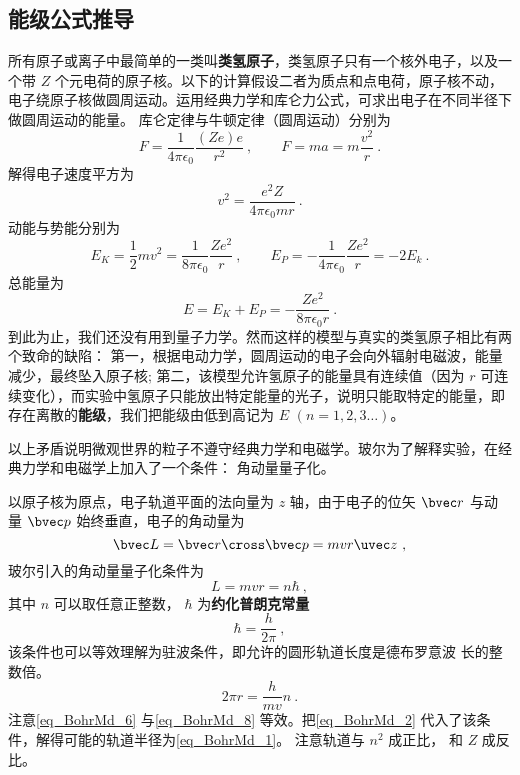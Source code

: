 \subsection{能级公式推导}
所有原子或离子中最简单的一类叫\textbf{类氢原子}，类氢原子只有一个核外电子，以及一个带 $Z$ 个元电荷的原子核。以下的计算假设二者为质点和点电荷，原子核不动，电子绕原子核做圆周运动。运用经典力学和库仑力公式，可求出电子在不同半径下做圆周运动的能量。 库仑定律与牛顿定律（圆周运动）分别为
\begin{equation}
F = \frac{1}{4\pi \epsilon_0} \frac{(Ze)e}{r^2}~,
\qquad
F = ma = m\frac{v^2}{r}~.
\end{equation}
解得电子速度平方为
\begin{equation}\label{eq_BohrMd_2}
v^2 = \frac{e^2 Z}{4\pi \epsilon_0 mr}~.
\end{equation}
动能与势能分别为
\begin{equation}
E_K = \frac12 m v^2 = \frac{1}{8\pi\epsilon_0} \frac{Z e^2}{r}~,
\qquad
E_P =  -\frac{1}{4\pi\epsilon_0} \frac{Ze^2}{r} = -2 E_k~.
\end{equation}   
总能量为
\begin{equation}\label{eq_BohrMd_4}
E = E_K + E_P =  -\frac{Z e^2}{8\pi\epsilon_0 r}~.
\end{equation}
到此为止，我们还没有用到量子力学。然而这样的模型与真实的类氢原子相比有两个致命的缺陷： 第一，根据电动力学，圆周运动的电子会向外辐射电磁波，能量减少，最终坠入原子核; 第二，该模型允许氢原子的能量具有连续值（因为 $r$ 可连续变化），而实验中氢原子只能放出特定能量的光子，说明只能取特定的能量，即存在离散的\textbf{能级}，我们把能级由低到高记为 $E$  $(n = 1,2,3\dots)$。 

以上矛盾说明微观世界的粒子不遵守经典力学和电磁学。玻尔为了解释实验，在经典力学和电磁学上加入了一个条件： 角动量量子化。

以原子核为原点，电子轨道平面的法向量为 $z$ 轴，由于电子的位矢 $\bvec r$ 与动量 $\bvec p$ 始终垂直，电子的角动量为
\begin{equation}
\bvec L = \bvec r \cross \bvec p = mvr \uvec z~,
\end{equation}
玻尔引入的角动量量子化条件为
\begin{equation}\label{eq_BohrMd_6}
L = mvr = n\hbar~,
\end{equation}
其中 $n$ 可以取任意正整数， $\hbar$ 为\textbf{约化普朗克常量}
\begin{equation}\label{eq_BohrMd_7}
\hbar  = \frac{h}{2\pi}~,
\end{equation}
该条件也可以等效理解为驻波条件，即允许的圆形轨道长度是德布罗意波%
长的整数倍。
\begin{equation}\label{eq_BohrMd_8}
2\pi r  = \frac{h}{mv} n~.
\end{equation}
注意\autoref{eq_BohrMd_6} 与\autoref{eq_BohrMd_8} 等效。把\autoref{eq_BohrMd_2} 代入了该条件，解得可能的轨道半径为\autoref{eq_BohrMd_1}。 注意轨道与 $n^2$ 成正比， 和 $Z$ 成反比。

